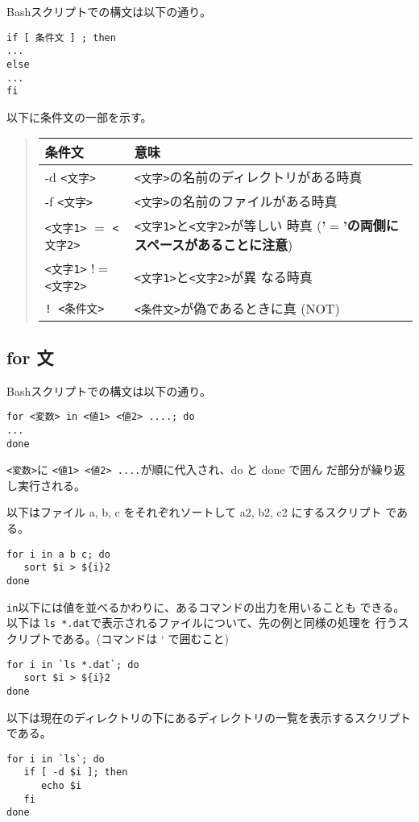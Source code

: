\documentclass{jreport}
\begin{document}
Bashスクリプトでの構文は以下の通り。
\begin{screen}
\begin{verbatim}
if [ 条件文 ] ; then
...
else
...
fi
\end{verbatim}
\end{screen}

以下に条件文の一部を示す。
\begin{quote}
\begin{tabular}[t]{lp{10cm}}\hline
条件文 & 意味 \\ \hline
-d \verb|<文字>| & \verb|<文字>|の名前のディレクトリがある時真\\
-f \verb|<文字>| & \verb|<文字>|の名前のファイルがある時真\\
\verb|<文字1>| $=$ \verb|<文字2>| & \verb|<文字1>|と\verb|<文字2>|が等しい
時真 (\textbf{'$=$'の両側にスペースがあることに注意})\\
\verb|<文字1>| $!=$ \verb|<文字2>| & \verb|<文字1>|と\verb|<文字2>|が異
なる時真\\
\verb|! <条件文>| & \verb|<条件文>|が偽であるときに真 (NOT)\\
\hline
\end{tabular}
\end{quote}

\subsection{for 文}
Bashスクリプトでの構文は以下の通り。
\begin{screen}
\begin{verbatim}
for <変数> in <値1> <値2> ....; do
...
done
\end{verbatim}
\end{screen}
\verb|<変数>|に \verb|<値1> <値2> ....|が順に代入され、do と done で囲ん
だ部分が繰り返し実行される。

以下はファイル a, b, c をそれぞれソートして a2, b2, c2 にするスクリプト
である。
\begin{screen}
\begin{verbatim}
for i in a b c; do
   sort $i > ${i}2
done
\end{verbatim}
\end{screen}
\verb|in|以下には値を並べるかわりに、あるコマンドの出力を用いることも
できる。
以下は \verb|ls *.dat|で表示されるファイルについて、先の例と同様の処理を
行うスクリプトである。(コマンドは ` で囲むこと)
\begin{screen}
\begin{verbatim}
for i in `ls *.dat`; do
   sort $i > ${i}2
done
\end{verbatim}
\end{screen}
以下は現在のディレクトリの下にあるディレクトリの一覧を表示するスクリプト
である。
\begin{screen}
\begin{verbatim}
for i in `ls`; do
   if [ -d $i ]; then
      echo $i
   fi
done
\end{verbatim}
\end{screen}
\end{document}
